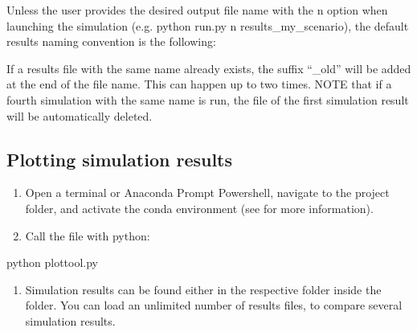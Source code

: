 \documentclass[letterpaper,10pt,english]{sphinxmanual}
\begin{document}
\sphinxAtStartPar
Unless the user provides the desired output file name with the \sphinxhyphen{}n option when launching the simulation (e.g. python run.py \sphinxhyphen{}n results\_my\_scenario), the default results naming convention is the following:

\sphinxAtStartPar
{}

\sphinxAtStartPar
If a results file with the same name already exists, the suffix “\_old” will be added at the end of the file name. This can happen up to two times. NOTE that if a fourth simulation with the same name is run, the file of the first simulation result will be automatically deleted.


\subsection{Plotting simulation results}
\label{\detokenize{usage:plotting-simulation-results}}\label{\detokenize{usage:id2}}\begin{enumerate}
%
\item {} 
\sphinxAtStartPar
Open a terminal or Anaconda Prompt Powershell, navigate to the project folder, and activate the conda environment (see {\hyperref[\detokenize{navigating::doc}]{}} for more information).

\item {} 
\sphinxAtStartPar
Call the  file with python:

\end{enumerate}

\begin{sphinxVerbatim}[commandchars=\\\{\}]
 python plot\PYGZus{}tool.py
\end{sphinxVerbatim}
\begin{enumerate}
%
\setcounter{enumi}{2}
\item {} 
\sphinxAtStartPar
Simulation results can be found either in the respective folder inside the  folder. You can load an unlimited number of results files, to compare several simulation results.

\end{enumerate}
\end{document}

